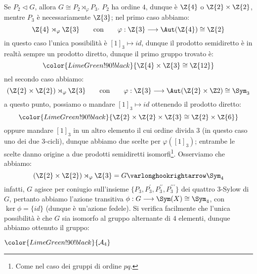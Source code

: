 \documentclass[11pt]{scrartcl}
\begin{document}
\begin{example}
    Se $P_2 \triangleleft G$, allora $G \cong P_2 \rtimes_{\varphi} P_3$. $P_2$ ha ordine $4$, dunque è $\Z{4}$ o $\Z{2} \times \Z{2}$, mentre $P_3$ è necessariamente $\Z{3}$; nel primo caso abbiamo:
                \[ \Z{4} \rtimes_{\varphi} \Z{3} \qquad \text{con} \qquad \varphi : \Z{3} \longrightarrow \Aut(\Z{4}) \cong \Z{2}
                    \]
    in questo caso l'unica possibilità è $[1]_3 \longmapsto id$, dunque il prodotto semidiretto è in realtà sempre un prodotto diretto, dunque il primo gruppo trovato è:
                \[ \color{LimeGreen!90!black}{\Z{4} \times \Z{3} \cong \Z{12}}
                    \]
    nel secondo caso abbiamo:
                \[ (\Z{2} \times \Z{2}) \rtimes_{\varphi} \Z{3} \qquad \text{con} \qquad \varphi : \Z{3} \longrightarrow \Aut(\Z{2} \times \Z2) \cong \Sym_3
                    \]
    a questo punto, possiamo o mandare $[1]_3 \longmapsto id$ ottenendo il prodotto diretto:
            \[ \color{LimeGreen!90!black}{\Z{2} \times \Z{2} \times \Z{3} \cong \Z{2} \times \Z{6}}
                \]
    oppure mandare $[1]_3$ in un altro elemento il cui ordine divida $3$ (in questo caso uno dei due $3$-cicli),
    dunque abbiamo due scelte per $\varphi([1]_3)$; entrambe le scelte danno origine a due prodotti semidiretti isomorfi\footnote{Come nel caso dei gruppi di ordine $pq$.}.
    Osserviamo che abbiamo:
                \[ (\Z{2} \times \Z{2}) \rtimes_{\varphi} \Z{3} = G \varlonghookrightarrow \Sym_4
                    \]
    infatti, $G$ agisce per coniugio sull'insieme $\{P_3,P_3^{\prime},P_3^{\prime\prime},P_3^{\prime\prime\prime}\}$ dei quattro $3$-Sylow di $G$, pertanto abbiamo l'azione transitiva
    $\phi : G \longrightarrow \Sym(X) \cong \Sym_4$, con $\ker \phi = \{id\}$ (dunque è un'azione fedele).
    Si verifica facilmente che l'unica possibilità è che $G$ sia isomorfo al gruppo alternante di $4$ elementi, dunque abbiamo ottenuto il gruppo:
        \begin{center}
            $\color{LimeGreen!90!black}{\mathcal{A}_4}$
        \end{center}
\end{example}
\nopagebreak 
\end{document}
